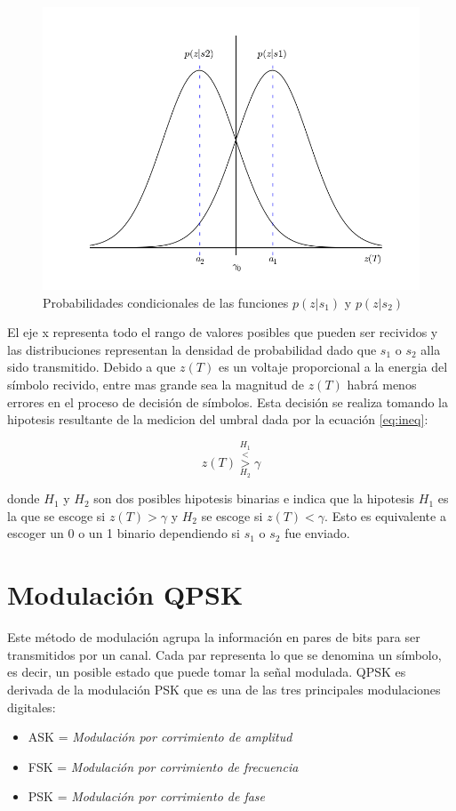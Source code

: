 \begin{figure}[htp]
\centering
	\includegraphics[width=5.5in]{figs/condpdf}
	\caption{Probabilidades condicionales de las funciones $p(z|s_1)$ y $p(z|s_2)$}
	\label{fig:condpdf}
\end{figure}

El eje x representa todo el rango de valores posibles que pueden ser recividos y las distribuciones
representan la densidad de probabilidad dado que $s_1$ o $s_2$ alla sido transmitido. Debido a que
$z(T)$ es un voltaje proporcional a la energia del s\'imbolo recivido, entre mas grande sea la
magnitud de $z(T)$ habr\'a menos errores en el proceso de decisi\'on de s\'imbolos. Esta decisi\'on
se realiza tomando la hipotesis resultante de la medicion del umbral dada por la ecuaci\'on
\ref{eq:ineq}\cite{sklar}:

\begin{equation}
z(T)\overset{H_1}{\underset{H_2}{\overset{<}{>}}}\gamma
\end{equation}\label{eq:ineq}

donde $H_1$ y $H_2$ son dos posibles hipotesis binarias e indica que la hipotesis $H_1$ es la que se
escoge si $z(T)>\gamma$ y $H_2$ se escoge si $z(T)< \gamma$. Esto es equivalente a escoger un 0 o un
1 binario dependiendo si $s_1$ o $s_2$ fue enviado.
\section{Modulaci\'on QPSK}

Este m\'etodo de modulaci\'on agrupa la informaci\'on en pares de
bits para ser transmitidos por un canal. Cada par representa lo que se denomina
un s\'imbolo, es decir, un posible estado que puede tomar la se\~nal modulada.
QPSK es derivada de la modulaci\'on PSK que es una de las tres principales
modulaciones digitales:
\begin{itemize}
  \item ASK = \emph{Modulaci\'on por corrimiento de amplitud}
  \item FSK = \emph{Modulaci\'on por corrimiento de frecuencia}
  \item PSK = \emph{Modulaci\'on por corrimiento de fase}
\end{itemize}

